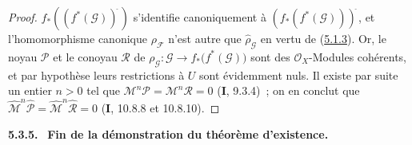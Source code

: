 \begin{proof}
$\widehat f_*((f^*(\mathcal G))^{\widehat{\,}})$ s'identifie canoniquement à
$(f_*(f^*(\mathcal G)))^{\widehat{\,}}$,
et l'homomorphisme canonique $\rho_{\mathcal F}$ n'est autre que
$\widehat{\rho}_{\mathcal G}$ en vertu de
(\hyperref[III.5.1.3-fr]{5.1.3}). Or, le noyau $\mathcal P$ et le conoyau
$\mathcal R$ de
$\rho_{\mathcal G}:\mathcal G\longrightarrow f_*\bigl(f^*(\mathcal G)\bigr)$
sont des $\mathcal O_X$-Modules cohérents, et par hypothèse leurs restrictions à
$U$ sont évidemment nuls. Il existe par suite un entier $n>0$ tel que
$\mathcal M^n\mathcal P=\mathcal M^n\mathcal R=0$ (\textbf{I}, 9.3.4)~; on en conclut que
$\widehat{\mathcal M}^{n}\widehat{\mathcal P}=
\widehat{\mathcal M}^{n}\widehat{\mathcal R}=0$
(\textbf{I}, 10.8.8 et 10.8.10).
\end{proof}

\par\medskip\noindent\textbf{5.3.5.}\ \label{III.5.3.5-fr}
\textbf{Fin de la démonstration du théorème d'existence.}

